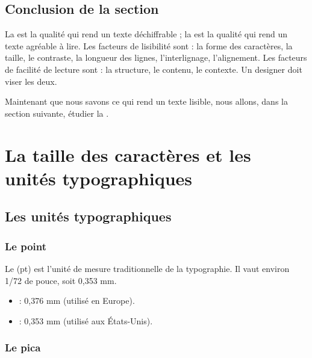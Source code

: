 \subsection*{Conclusion de la section}

\begin{retenir}
La  est la qualité qui rend un texte déchiffrable ; la  est la qualité qui rend un texte agréable à lire. Les facteurs de lisibilité sont : la forme des caractères, la taille, le contraste, la longueur des lignes, l'interlignage, l'alignement. Les facteurs de facilité de lecture sont : la structure, le contenu, le contexte. Un designer doit viser les deux.
\end{retenir}

Maintenant que nous savons ce qui rend un texte lisible, nous allons, dans la section suivante, étudier la .

\section{La taille des caractères et les unités typographiques}

\subsection{Les unités typographiques}

\subsubsection{Le point}

Le  (pt) est l'unité de mesure traditionnelle de la typographie. Il vaut environ 1/72 de pouce, soit 0,353 mm.

\begin{itemize}
    \item {} : 0,376 mm (utilisé en Europe).
    \item {} : 0,353 mm (utilisé aux États-Unis).
\end{itemize}

\subsubsection{Le pica}

